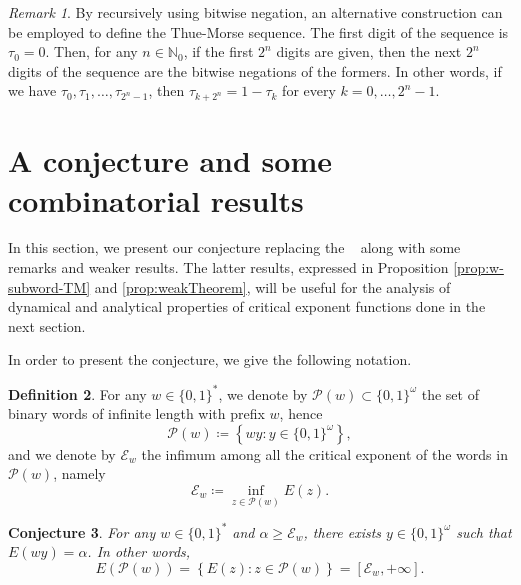 \documentclass[12pt]{article}
\theoremstyle{plain}\newtheorem{teo}{Theorem}
\theoremstyle{plain}\newtheorem{proposition}[teo]{Proposition}
\theoremstyle{plain}\newtheorem{lemma}[teo]{Lemma}
\theoremstyle{plain}\newtheorem{corollary}[teo]{Corollary}
\theoremstyle{plain}\newtheorem{conjecture}[teo]{Conjecture}
\theoremstyle{definition}\newtheorem{definition}[teo]{Definition}
\theoremstyle{remark}\newtheorem{remark}[teo]{Remark}
\theoremstyle{definition}\newtheorem{example}[teo]{Example}
\numberwithin{teo}{section}
\numberwithin{equation}{section}
\begin{document}
\begin{remark}
	\label{rem:ThueMorse-bitwiseConstruction}
	By recursively using bitwise negation, an alternative
	construction can be employed to define the Thue-Morse sequence.
	The first digit of the sequence is $\tau_0 = 0$.
	Then, for any $n\in\mathbb{N}_0$,  if the first $2^n$ digits are given,
	then the next $2^n$ digits of the sequence are
	the bitwise negations of the formers.
	In other words, if we have
	$\tau_0,\tau_1,\dots,\tau_{2^n - 1}$,
	then
	$\tau_{k+2^n} = 1 - \tau_{k}$
	for every $k = 0,\dots,2^{n}-1$.
\end{remark}


\section{A conjecture and some combinatorial results}
\label{sec:combinatorial}

In this section, we present our conjecture replacing the ~\cite[Theorem 7]{Critical} along with some remarks and weaker results. The latter results, expressed in Proposition \ref{prop:w-subword-TM} and \ref{prop:weakTheorem},  will be useful for the analysis of dynamical and analytical properties of critical exponent functions done in the next section.

In order to present the conjecture, we give the following notation.
\begin{definition}
For any $w \in \{0,1\}^*$,
we denote by $\mathcal{P}(w)\subset \{0,1\}^{\omega}$
the set of binary words of infinite length with prefix $w$,
hence 
\begin{equation}
	\label{eq:defPw}
	\mathcal{P}(w) \coloneqq \left\{
		wy: y \in \{0,1\}^{\omega}
	\right\},
\end{equation}
and we denote by $\mathcal{E}_w$
the infimum among all the critical exponent 
of the words in $\mathcal{P}(w)$, namely
\begin{equation}
	\label{eq:def-calEw}
	\mathcal{E}_w \coloneqq
	\inf_{z \in \mathcal{P}(w)} E(z).
\end{equation}
\end{definition}

\begin{conjecture}
	\label{conj:ourCon}
	For any $w \in \{0,1\}^*$
	and $\alpha \ge \mathcal{E}_w$,
	there exists $y \in \{0,1\}^\omega$
	such that
	$E(wy) = \alpha$.
	In other words,
	\[
		E(\mathcal{P}(w)) =
		\left\{ E(z): z \in \mathcal{P}(w) \right\}
		=
		[\mathcal{E}_{w},+\infty].
	\]
\end{conjecture}
\end{document}

